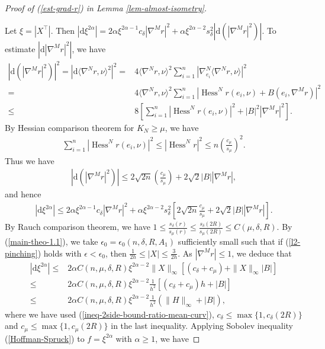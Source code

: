 \documentclass{amsart}
\numberwithin{equation}{section}
\theoremstyle{remark}
\renewcommand{\(}{\left(}
\renewcommand{\)}{\right)}
\renewcommand{\~}{\tilde}
\renewcommand{\-}{\overline}
\renewcommand{\a}{\alpha}
\renewcommand{\d}{\delta}
\newcommand{\e}{\epsilon}
\newcommand{\mrm}{\mathrm}
\newcommand{\Hess}{\operatorname{Hess }}
\begin{document}
\vspace{2mm}
\begin{proof}[Proof of (\ref{est-grad-r}) in Lemma \ref{lem-almost-isometry}]
	~
	
	Let $\xi=|X^\top|$. Then $|\mrm{d} \xi^{2\a}|=2\a \xi^{2\a-1} c_\d |\nabla^M r|^2 + \a \xi^{2\a-2} s_\d^2 \left| \mrm{d}\(|\nabla^M r|^2\)\right|$. To estimate $\left|\mrm{d}|\nabla^M r|^2\right|$, we have
	\begin{align*}
	\left|\mrm{d}\(|\nabla^M r|^2\)\right|^2 =\left|\mrm{d}\langle \nabla^N r,\nu\rangle^2 \right|^2
	= & 4\langle \nabla^{N}r,\nu\rangle^2 \sum_{i=1}^{n}\left|\nabla^N_{e_i}\langle \nabla^N r,\nu\rangle \right|^2 \\
	= & 4\langle \nabla^{N}r,\nu\rangle^2 \sum_{i=1}^{n}\left|\Hess^N r(e_i,\nu)+B(e_i,\nabla^M r)\right|^2 \\
	\leq &8 \left[\sum_{i=1}^{n}|\Hess^N r(e_i,\nu)|^2+|B|^2|\nabla^M r|^2 \right].
	\end{align*}
	By Hessian comparison theorem for $K_N\geq \mu$, we have
	\begin{align*}
	\sum_{i=1}^{n}|\Hess^N r (e_i,\nu)|^2 \leq |\Hess^N r|^2 \leq n\(\frac{ c_\mu}{ s_\mu}\)^2.
	\end{align*}
	Thus we have
	\begin{align*}
	\left|\mrm{d}\(|\nabla^M r|^2\)\right| \leq 2\sqrt{2n}\(\frac{c_\mu}{ s_\mu}\)+2\sqrt{2}|B||\nabla^M r|,
	\end{align*}
	and hence
	\begin{align*}
	|\mrm{d} \xi^{2\a}| \leq 2\a \xi^{2\a-1}c_\d |\nabla^M r|^2+\a \xi^{2\a-2}s_\d^2\left[ 2\sqrt{2n}\frac{c_\mu}{s_\mu}+2\sqrt{2}|B||\nabla^M r| \right].
	\end{align*}
	By Rauch comparison theorem, we have $1\leq \frac{ s_\d(r)}{ s_\mu(r)} \leq \frac{s_\d(2R)}{ s_\mu(2R)}\leq C(\mu,\d,R)$. By (\ref{main-theo-1.1}), we take $\e_0=\e_0(n,\d,R,A_1)$ sufficiently small such that if (\ref{l2-pinching}) holds with $\e<\e_0$, then $\frac{1}{2h} \leq |X|\leq \frac{3}{2h}$. As $|\nabla^M r|\leq 1$, we deduce that
	\begin{align*}
	|\mrm{d} \xi^{2\a}| \leq &2\a C(n,\mu,\d,R) \xi^{2\a-2} \|X\|_\infty\left[(c_\d+c_{\mu})+ \|X\|_\infty |B|\right] \\
	\leq &2\a C(n,\mu,\d,R) \xi^{2\a-2} \frac{1}{h^2}\left[ ( c_\d+ c_\mu)h+|B| \right] \\
	\leq &2\a C(n,\mu,\d,R) \xi^{2\a-2} \frac{1}{h^2}\( \|H\|_\infty+|B| \),
	\end{align*}
	where we have used (\ref{ineq-2side-bound-ratio-mean-curv}), $ c_\d \leq \max\{1,c_\d(2R)\}$ and $ c_\mu \leq \max\{1,c_\mu(2R)\}$ in the last inequality. Applying Sobolev inequality (\ref{Hoffman-Spruck}) to $f=\xi^{2\a}$ with $\a\geq 1$, we have

\end{proof}
\end{document}
